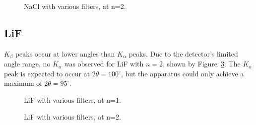 \documentclass[aps,prl,twocolumn,superscriptaddress]{revtex4-1}
\begin{document}
\begin{figure}[H]
	\begin{center}
		\centerline{}
		\caption{\small{NaCl with various filters, at n=2. \label{fig:NaCln2}}}
	\end{center}
\end{figure}





\vfill\eject


\subsection{LiF}

$K_{\beta}$ peaks occur at lower angles than $K_{\alpha}$ peaks.  Due to the detector's limited angle range, no $K_{\alpha}$ was observed for LiF with $n=2$, shown by Figure~\ref{fig:LiFn2}.  The $K_{\alpha}$ peak is expected to occur at $2\theta=100^{\circ}$, but the apparatus could only achieve a maximum of $2\theta=95^{\circ}$.


\begin{figure}[H]
	\begin{center}
		\centerline{}
		\caption{\small{LiF with various filters, at n=1. \label{fig:LiFn1}}}
	\end{center}
\end{figure}

\begin{figure}[H]
	\begin{center}
		\centerline{}
		\caption{\small{LiF with various filters, at n=2. \label{fig:LiFn2}}}
	\end{center}
\end{figure}


\end{document}
